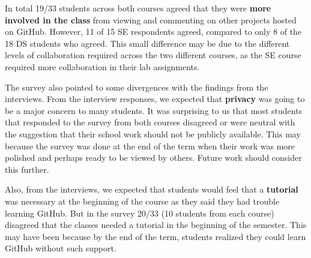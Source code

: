 In total 19/33 students across both courses agreed that they were \textbf{more involved in the class} from viewing and commenting on other projects hosted on GitHub.
However, 11 of 15 SE respondents agreed, compared to only 8 of the 18 DS students who agreed.
This small difference may be due to the different levels of collaboration required across the two different courses, as the SE course required more collaboration in their lab assignments.

The survey also pointed to some divergences with the findings from the interviews.
From the interview responses, we expected that \textbf{privacy} was going to be a major concern to many students.
It was surprising to us that most students that responded to the survey from both courses disagreed or were neutral with the suggestion that their school work should not be publicly available.  This may because the survey was done at the end of the term when their work was more polished and perhaps ready to be viewed by others.  Future work should consider this further.

Also, from the interviews, we expected that students would feel that a \textbf{tutorial} was necessary at the beginning of the course as they said they had trouble learning GitHub.  But in the survey 20/33 (10 students from each course) disagreed that the classes needed a tutorial in the beginning of the semester.  This may have been because by the end of the term, students realized they could learn GitHub without such support.












